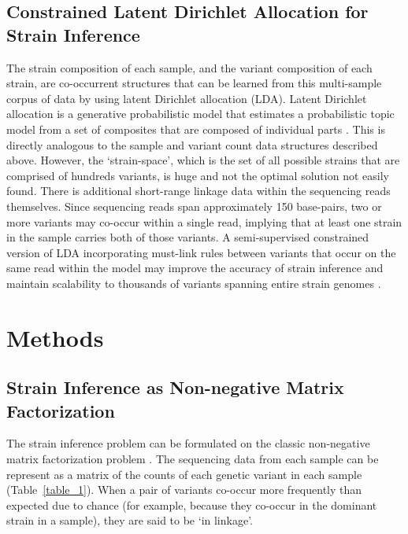 \documentclass{article}
\begin{document}
\subsection{Constrained Latent Dirichlet Allocation for Strain Inference}

The strain composition of each sample, and the variant composition of each strain, are co-occurrent structures that can be learned from this multi-sample corpus of data by using latent Dirichlet allocation (LDA). Latent Dirichlet allocation is a generative probabilistic model that estimates a probabilistic topic model from a set of composites that are composed of individual parts \cite{Blei2003}. This is directly analogous to the sample and variant count data structures described above. However, the ‘strain-space’, which is the set of all possible strains that are comprised of hundreds variants, is huge and not the optimal solution not easily found. There is additional short-range linkage data within the sequencing reads themselves. Since sequencing reads span approximately 150 base-pairs, two or more variants may co-occur within a single read, implying that at least one strain in the sample carries both of those variants. A semi-supervised constrained version of LDA incorporating must-link rules between variants that occur on the same read within the model may improve the accuracy of strain inference and maintain scalability to thousands of variants spanning entire strain genomes \cite{Zhai2011}. 


\section{Methods} \label{Methods}

\subsection{Strain Inference as Non-negative Matrix Factorization} \label{NNMF}

The strain inference problem can be formulated on the classic non-negative matrix factorization problem \cite{Paatero1994}. The sequencing data from each sample can be represent as a matrix of the counts of each genetic variant in each sample (Table~\ref{table_1}). When a pair of variants co-occur more frequently than expected due to chance (for example, because they co-occur in the dominant strain in a sample), they are said to be ‘in linkage’. 
\end{document}
